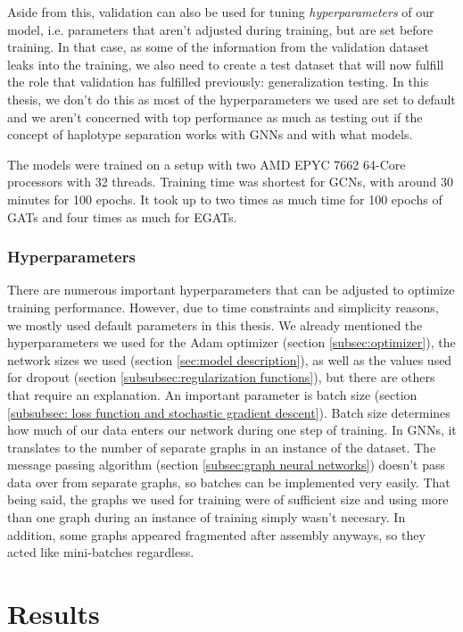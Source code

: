 \documentclass[times, utf8, diplomski, english]{fer_eng}
\begin{document}
Aside from this, validation can also be used for tuning \textit{hyperparameters} of our model, i.e. parameters that aren't adjusted during training, but are set before training. In that case, as some of the information from the validation dataset leaks into the training,  we also need to create a test dataset that will now fulfill the role that validation has fulfilled previously: generalization testing. In this thesis, we don't do this as most of the hyperparameters we used are set to default and we aren't concerned with top performance as much as testing out if the concept of haplotype separation works with GNNs and with what models.

The models were trained on a setup with two AMD EPYC 7662 64-Core processors with 32 threads. Training time was shortest for GCNs, with around 30 minutes for 100 epochs. It took up to two times as much time for 100 epochs of GATs and four times as much for EGATs.

\subsection{Hyperparameters}
\label{subsec:hyperparameters}

There are numerous important hyperparameters that can be adjusted to optimize training performance. However, due to time constraints and simplicity reasons, we mostly used default parameters in this thesis. We already mentioned the hyperparameters we used for the Adam optimizer (section \ref{subsec:optimizer}), the network sizes we used (section \ref{sec:model description}), as well as the values used for dropout (section \ref{subsubsec:regularization functions}), but there are others that require an explanation. An important parameter is batch size (section \ref{subsubsec: loss function and stochastic gradient descent}). Batch size determines how much of our data enters our network during one step of training. In GNNs, it translates to the number of separate graphs in an instance of the dataset. The message passing algorithm (section \ref{subsec:graph neural networks}) doesn't pass data over from separate graphs, so batches can be implemented very easily. That being said, the graphs we used for training were of sufficient size and using more than one graph during an instance of training simply wasn't necesary. In addition, some graphs appeared fragmented after assembly anyways, so they acted like mini-batches regardless.

\chapter{Results}
\label{ch:results}
\end{document}
